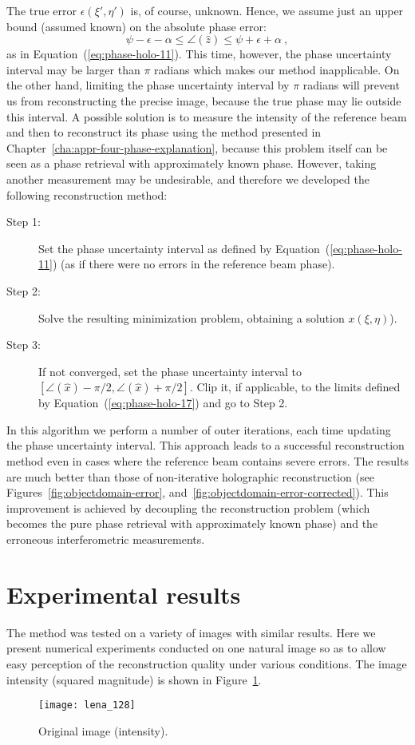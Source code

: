 The true error $\epsilon(\xi',\eta')$ is, of course, unknown. Hence,
we assume just an upper bound (assumed known) on the absolute
phase error:
\begin{equation}
  \label{eq:phase-holo-17}
  \psi-\epsilon-\alpha
  \leq\angle(\hat{z})\leq\psi+\epsilon+\alpha\ ,
\end{equation}
as in Equation~(\ref{eq:phase-holo-11}). This time, however, the phase
uncertainty interval may be larger than $\pi$ radians which makes our
method inapplicable. On the other hand, limiting the phase uncertainty
interval by $\pi$ radians will prevent us from reconstructing the
precise image, because the true phase may lie outside this interval. A
possible solution is to measure the intensity of the reference beam
and then to reconstruct its phase using the method presented in
Chapter~\ref{cha:appr-four-phase-explanation}, because this problem
itself can be seen as a phase retrieval with approximately known
phase. However, taking another measurement may be undesirable, and
therefore we developed the following reconstruction method:
\begin{description}
\item[Step 1:] Set the phase uncertainty interval as defined by
  Equation~(\ref{eq:phase-holo-11}) (as if there were no errors in the reference
  beam phase).

\item[Step 2:] Solve the resulting minimization problem, obtaining a
solution $x(\xi,\eta)$).

\item[Step 3:] If not converged, set the phase uncertainty interval to
  $[\angle(\hat{x}) - \pi/2, \angle(\hat{x}) + \pi/2]$. Clip it, if
  applicable, to the limits defined by Equation~(\ref{eq:phase-holo-17}) and go to
  Step 2.
\end{description}

In this algorithm we perform a number of outer iterations, each
time updating the phase uncertainty interval. This approach leads
to a successful reconstruction method even in cases where the
reference beam contains severe errors. The results are much better
than those of non-iterative holographic reconstruction (see
Figures~\ref{fig:objectdomain-error},
and~\ref{fig:objectdomain-error-corrected}).  This improvement is
achieved by decoupling the reconstruction problem (which becomes
the pure phase retrieval with approximately known phase) and the
erroneous interferometric measurements.

\section{Experimental results}
\label{sec:phase-holo-results} 
The method was tested on a variety of images with similar
results. Here we present numerical experiments conducted on one
natural image so as to allow easy perception of the reconstruction
quality under various conditions. The image intensity (squared
magnitude) is shown in Figure~\ref{fig:experimenal-image}.
\begin{figure}[H]
  \centering
  \texttt{[image: lena\_128]}
  \caption[Test image]{Original image (intensity).}
  \label{fig:experimenal-image}
\end{figure}


